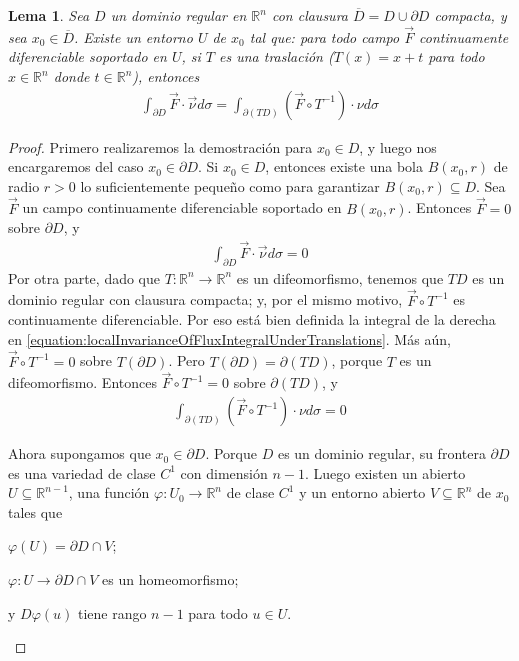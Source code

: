 \documentclass{report}
\newcommand{\realNumbers}{\mathbb{R}}
\newtheorem{lemma}{Lema}
\theoremstyle{remark}
\begin{document}
  \begin{lemma}
    Sea \(D\) un dominio regular en \(\realNumbers^n\) con clausura \(\overline{D} = D \cup \partial D\) compacta, y sea \(x_0 \in \overline{D}\).
    Existe un entorno \(U\) de \(x_0\) tal que:
    para todo campo \(\vec{F}\) continuamente diferenciable soportado en \(U\), si \(T\) es una traslación (\(T(x) = x + t\) para todo \(x \in \realNumbers^n\) donde \(t \in \realNumbers^n\)), entonces
    \begin{align}
      \label{equation:localInvarianceOfFluxIntegralUnderTranslations}
      \int_{\partial D} \vec{F} \cdot \vec{\nu} d \sigma
      =
      \int_{\partial (T D)} (\vec{F} \circ T^{- 1}) \cdot \nu d \sigma
    \end{align}
  \end{lemma}
  \begin{proof}
    Primero realizaremos la demostración para \(x_0 \in D\), y luego nos encargaremos del caso \(x_0 \in \partial D\).
    Si \(x_0 \in D\), entonces existe una bola \(B(x_0, r)\) de radio \(r > 0\) lo suficientemente pequeño como para garantizar \(B(x_0, r) \subseteq D\).
    Sea \(\vec{F}\) un campo continuamente diferenciable soportado en \(B(x_0, r)\).
    Entonces \(\vec{F} = 0\) sobre \(\partial D\), y 
    \begin{align}
      \int_{\partial D} \vec{F} \cdot \vec{\nu} d \sigma
      =
      0
    \end{align}
    Por otra parte, dado que \(T : \realNumbers^n \rightarrow \realNumbers^n\) es un difeomorfismo, tenemos que \(T D\) es un dominio regular con clausura compacta;
    y, por el mismo motivo, \(\vec{F} \circ T^{- 1}\) es continuamente diferenciable.
    Por eso está bien definida la integral de la derecha en \eqref{equation:localInvarianceOfFluxIntegralUnderTranslations}.
    Más aún, \(\vec{F} \circ T^{- 1} = 0\) sobre \(T(\partial D)\).
    Pero \(T(\partial D) = \partial(T D)\), porque \(T\) es un difeomorfismo.
    Entonces \(\vec{F} \circ T^{- 1} = 0\) sobre \(\partial (T D)\), y 
    \begin{align}
      \int_{\partial (T D)} (\vec{F} \circ T^{- 1}) \cdot \nu d \sigma
      =
      0
    \end{align}

    Ahora supongamos que \(x_0 \in \partial D\).
    Porque \(D\) es un dominio regular, su frontera \(\partial D\) es una variedad de clase \(C^1\) con dimensión \(n - 1\).
    Luego existen un abierto \(U \subseteq \realNumbers^{n - 1}\), una función \(\varphi : U_0 \rightarrow \realNumbers^n\) de clase \(C^1\) y un entorno abierto \(V \subseteq \realNumbers^n\) de \(x_0\) tales que 
    \begin{enumerate*}
      \item \(\varphi(U) = \partial D \cap V\);
      \item \(\varphi : U \rightarrow \partial D \cap V\) es un homeomorfismo;
      \item y \(D \varphi (u)\) tiene rango \(n - 1\) para todo \(u \in U\).
    \end{enumerate*}



\end{proof}
\end{document}
